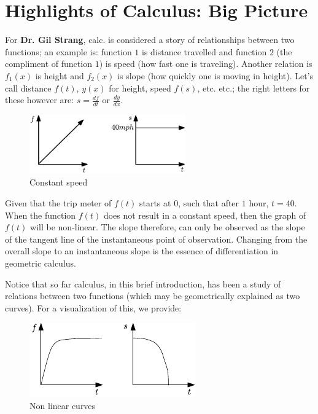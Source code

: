 \documentclass{article}
\begin{document}

\section{Highlights of Calculus: Big Picture}

For \textbf{Dr. Gil Strang}, calc. is considered a story of relationships between two functions; an example is: function $1$ is distance travelled and function $2$ (the compliment of function $1$) is speed (how fast one is traveling). Another relation is $f_1(x)$ is height and \( f_{2}(x) \) is slope (how quickly one is moving in height). Let's call distance \( f(t) \), \( y(x) \) for height, speed \( f(s) \), etc. etc.; the right letters for these however are: \(s= \frac{df}{dt} \) or \(  \frac{dy}{dx} \). 


\begin{figure}[ht]
    \centering
 \includegraphics[width=0.6\textwidth]{./figures/constantspeed.pdf}
 \caption{Constant speed}
    \label{fig:Constant speed}
\end{figure}

Given that the trip meter of \( f(t) \) starts at $0$, such that after $1$ hour, $t=40$. When the function $f(t)$ does not result in a constant speed, then the graph of $f(t)$ will be non-linear. The slope therefore, can only be observed as the slope of the tangent line of the instantaneous point of observation. Changing from the overall slope to an instantaneous slope is the essence of differentiation in geometric calculus. 

Notice that so far calculus, in this brief introduction, has been a study of relations between two functions (which may be geometrically explained as two curves). For a visualization of this, we provide:


\begin{figure}[ht]
    \centering
 \includegraphics[width=0.6
 \textwidth]{./figures/nonlinearcurve.pdf}
    \caption{Non linear curves}
    \label{fig:nonlinearcurve}
\end{figure}
\end{document}
